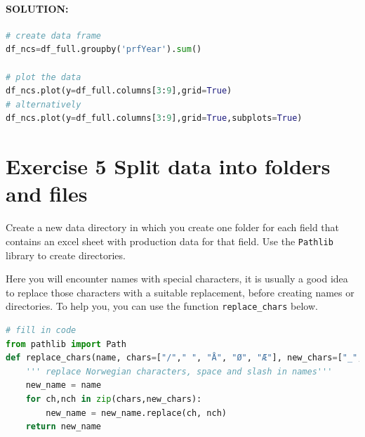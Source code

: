\documentclass[%
twoside,                 %
final,                   %
10pt]{article}
\newenvironment{notice_mdfboxadmon}[1][]{
\begin{notice_mdfboxmdframed}[frametitle=#1]
}
{
\end{notice_mdfboxmdframed}
}
\begin{document}
\noindent
\paragraph{SOLUTION:}









\begin{lstlisting}[language=Python,style=blue1bar]
# create data frame
df_ncs=df_full.groupby('prfYear').sum()

# plot the data
df_ncs.plot(y=df_full.columns[3:9],grid=True)
# alternatively
df_ncs.plot(y=df_full.columns[3:9],grid=True,subplots=True)

\end{lstlisting}


\section{Exercise 5 Split data into folders and files}

Create a new data directory in which you create one folder for each field that contains an excel sheet with production data for that field. Use the \texttt{Pathlib} library to create directories.


\begin{notice_mdfboxadmon}
Here you will encounter names with special characters, it is usually a good idea to replace those characters with a suitable replacement, before creating names or directories. To help you, you can use the function \Verb!replace_chars! below.
\end{notice_mdfboxadmon} %












\begin{lstlisting}[language=Python,style=blue1bar]
# fill in code
from pathlib import Path
def replace_chars(name, chars=["/"," ", "Å", "Ø", "Æ"], new_chars=["_","_","AA","O","AE"]):
    ''' replace Norwegian characters, space and slash in names'''
    new_name = name
    for ch,nch in zip(chars,new_chars):
        new_name = new_name.replace(ch, nch)
    return new_name


\end{lstlisting}
\end{document}
